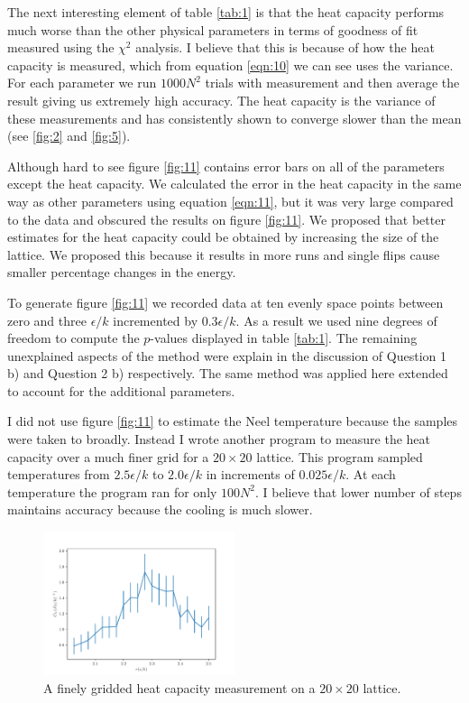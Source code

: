 \documentclass[a4paper, twocolumn]{article}
\begin{document}
The next interesting element of table \ref{tab:1} is that the heat capacity %
performs much worse than the other physical parameters in terms of %
goodness of fit measured using the \(\chi^{2}\) analysis. I believe that %
this is because of how the heat capacity is measured, which from equation %
\ref{eqn:10} we can see uses the variance. For each parameter we run %
\(1000N^{2}\) trials with measurement and then average the result %
giving us extremely high accuracy. The heat capacity is the variance %
of these measurements and has consistently shown to converge slower than %
the mean (see \ref{fig:2} and \ref{fig:5}).


Although hard to see figure \ref{fig:11} contains error bars on all of the %
parameters except the heat capacity. We calculated the error in the heat %
capacity in the same way as other parameters using equation \ref{eqn:11}, %
but it was very large compared to the data and obscured the results on %
figure \ref{fig:11}. We proposed that better estimates for the heat %
capacity could be obtained by increasing the size of the lattice. We %
proposed this because it results in more runs and single flips cause %
smaller percentage changes in the energy.


To generate figure \ref{fig:11} we recorded data at ten evenly space %
points between zero and three \(\epsilon / k\) incremented by \(0.3 %
\epsilon / k\). As a result we used nine degrees of freedom to compute %
the \(p\)-values displayed in table \ref{tab:1}. The remaining unexplained %
aspects of the method were explain in the discussion of Question 1 b) and %
Question 2 b) respectively. The same method was applied here extended to %
account for the additional parameters.


I did not use figure \ref{fig:11} to estimate the Neel temperature %
because the samples were taken to broadly. Instead I wrote another %
program to measure the heat capacity over a much finer grid for a %
\(20 \times 20\) lattice. This program sampled temperatures from %
\(2.5 \epsilon / k\) to \(2.0 \epsilon / k\) in increments of %
\(0.025 \epsilon / k\). At each temperature the program ran for %
only \(100N^{2}\). I believe that lower number of steps maintains %
accuracy because the cooling is much slower. 


\begin{figure}[h]
    \centering
    \includegraphics[width=0.5\textwidth]{pub/figures/heat_capacity_external_field.pdf}
    \caption{A finely gridded heat capacity measurement on a \(20 \times 20\) %
        lattice.}
    \label{fig:12}
\end{figure}
\end{document}
